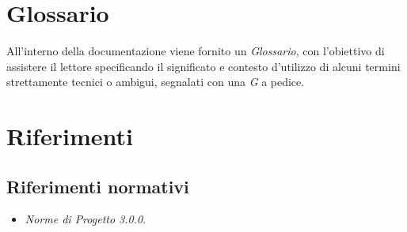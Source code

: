 \section{Glossario}\label{IntroduzioneGlossario}
All'interno della documentazione viene fornito un \textit{Glossario}, con l'obiettivo di assistere il lettore specificando il significato e contesto d'utilizzo di alcuni termini strettamente tecnici o ambigui, segnalati con una \textit{G} a pedice.

\section{Riferimenti}\label{IntroduzioneRiferimenti}

\subsection{Riferimenti normativi}\label{IntroduzioneRiferimentiRiferimentiNormativi}
\begin{itemize}
	\item \textit{Norme di Progetto 3.0.0}.
\end{itemize}

